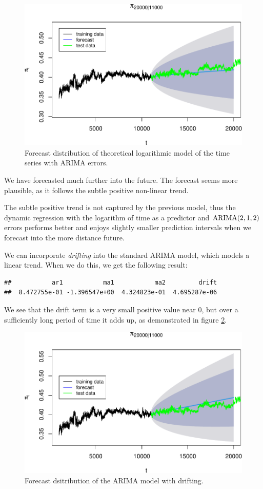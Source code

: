 \documentclass[final,
  11pt,
]{article}
\begin{document}
\begin{figure}
\includegraphics{paper_files/figure-latex/unnamed-chunk-20-1.pdf}
\caption{Forecast distribution of theoretical logarithmic model of the time series with ARIMA errors.}
\label{fig:theory}
\end{figure}

We have forecasted much further into the future. The forecast seems
more plausible, as it follows the subtle positive non-linear trend.

The subtle positive trend is not captured by the previous model,
thus the dynamic regression with the logarithm of time as a
predictor and \(\operatorname{ARIMA}(2,1,2)\) errors performs better and
enjoys slightly smaller prediction intervals when we forecast
into the more distance future.

We can incorporate \emph{drifting} into the standard ARIMA model,
which models a linear trend.
When we do this, we get the following result:
\begin{verbatim}
##           ar1           ma1           ma2         drift 
##  8.472755e-01 -1.396547e+00  4.324823e-01  4.695287e-06
\end{verbatim}

We see that the drift term is a very small positive value near \(0\),
but over a sufficiently long period of time it adds up, as demonstrated
in figure \ref{fig:drift}.

\begin{figure}
\includegraphics{paper_files/figure-latex/unnamed-chunk-22-1.pdf}
\caption{Forecast dsitribution of the ARIMA model with drifting.}
\label{fig:drift}
\end{figure}
\end{document}
